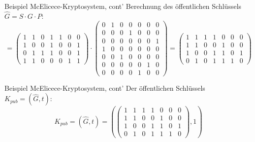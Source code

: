 \documentclass[11pt%
,aspectratio=169%
]{beamer}
\begin{document}
\begin{frame}{Beispiel McElicece-Kryptosystem, cont'}
Berechnung des öffentlichen Schlüssels $\hat{G} = S \cdot G \cdot P$:
$$
    =\begin{pmatrix} 1 & 1 & 0 & 1 & 1 & 0 & 0 \\ 1 & 0 & 0 & 1 & 0 & 0 & 1 \\ 0 & 1 & 1 & 1 & 0 & 0 & 1 \\ 1 & 1 & 0 & 0 & 0 & 1 & 1 \end{pmatrix} \cdot \begin{pmatrix} 0 & 1 & 0 & 0 & 0 & 0 & 0 \\ 0 & 0 & 0 & 1 & 0 & 0 & 0 \\ 0 & 0 & 0 & 0 & 0 & 0 & 1 \\ 1 & 0 & 0 & 0 & 0 & 0 & 0 \\ 0 & 0 & 1 & 0 & 0 & 0 & 0 \\ 0 & 0 & 0 & 0 & 0 & 1 & 0 \\ 0 & 0 & 0 & 0 & 1 & 0 & 0 \end{pmatrix}= \begin{pmatrix} 1 & 1 & 1 & 1 & 0 & 0 & 0 \\ 1 & 1 & 0 & 0 & 1 & 0 & 0 \\ 1 & 0 & 0 & 1 & 1 & 0 & 1 \\ 0 & 1 & 0 & 1 & 1 & 1 & 0 \end{pmatrix}
$$
\end{frame}

\begin{frame}{Beispiel McElicece-Kryptosystem, cont'}
Der öffentlichen Schlüssels $K_{pub} = (\hat{G},t)$:
$$
    K_{pub} = (\hat{G},t) =\left(\begin{pmatrix} 1 & 1 & 1 & 1 & 0 & 0 & 0 \\ 1 & 1 & 0 & 0 & 1 & 0 & 0 \\ 1 & 0 & 0 & 1 & 1 & 0 & 1 \\ 0 & 1 & 0 & 1 & 1 & 1 & 0 \end{pmatrix},1\right)
$$
\end{frame}
\end{document}
